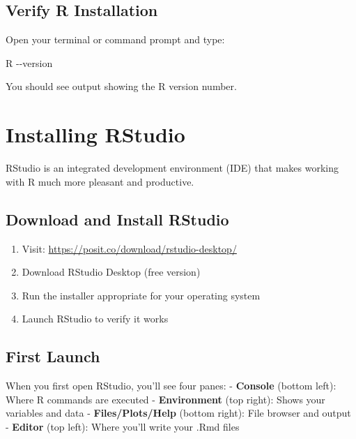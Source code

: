 \documentclass[
]{book}
\newenvironment{Shaded}{\begin{snugshade}}{\end{snugshade}}
\newcommand{\AttributeTok}[1]{\textcolor[rgb]{0.13,0.29,0.53}{#1}}
\newcommand{\ExtensionTok}[1]{#1}
\providecommand{\tightlist}{%
  \setlength{\itemsep}{0pt}\setlength{\parskip}{0pt}}
\begin{document}
\subsection{Verify R Installation}\label{verify-r-installation}

Open your terminal or command prompt and type:

\begin{Shaded}
\begin{Highlighting}[]
\ExtensionTok{R} \AttributeTok{{-}{-}version}
\end{Highlighting}
\end{Shaded}

You should see output showing the R version number.

\section{Installing RStudio}\label{installing-rstudio}

RStudio is an integrated development environment (IDE) that makes working with R much more pleasant and productive.

\subsection{Download and Install RStudio}\label{download-and-install-rstudio}

\begin{enumerate}
\def\labelenumi{\arabic{enumi}.}
\tightlist
\item
  Visit: \url{https://posit.co/download/rstudio-desktop/}
\item
  Download RStudio Desktop (free version)
\item
  Run the installer appropriate for your operating system
\item
  Launch RStudio to verify it works
\end{enumerate}

\subsection{First Launch}\label{first-launch}

When you first open RStudio, you'll see four panes:
- \textbf{Console} (bottom left): Where R commands are executed
- \textbf{Environment} (top right): Shows your variables and data
- \textbf{Files/Plots/Help} (bottom right): File browser and output
- \textbf{Editor} (top left): Where you'll write your .Rmd files
\end{document}
